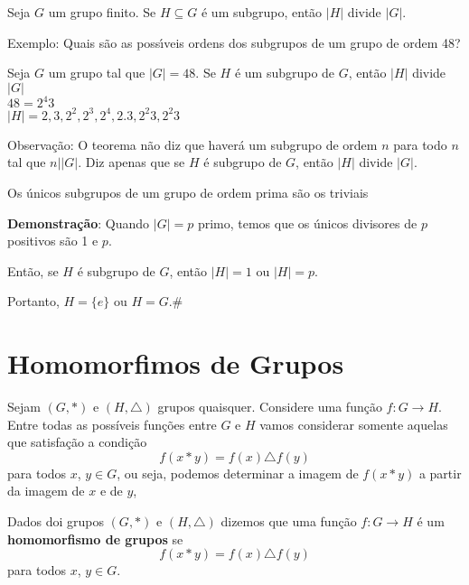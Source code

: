 \begin{teorema}[Lagrange]
Seja $G$ um grupo finito. Se $H\subseteq G$ {\'e} um subgrupo, ent{\~a}o $|H|$ divide $|G|$.
\end{teorema}

Exemplo: Quais s{\~a}o as poss{\'\i}veis ordens dos subgrupos de um grupo de ordem 48?

Seja $G$ um grupo tal que $|G|=48$. Se $H$ {\'e} um subgrupo de $G$, ent{\~a}o $|H|$ divide $|G|$\\
$48=2^{4}3$ \\
$|H|=2,3,2^{2},2^{3},2^{4},2.3,2^{2}3,2^{2}3$

Observa{\c c}{\~a}o: O teorema n{\~a}o diz que haver{\'a} um subgrupo de ordem $n$ para todo $n$ tal que $n||G|$. Diz apenas que se $H$ {\'e} subgrupo de $G$, ent{\~a}o $|H|$ divide $|G|$.

\begin{corolario}
Os {\'u}nicos subgrupos de um grupo de ordem prima s{\~a}o os triviais
\end{corolario}

\textbf{Demonstra{\c c}{\~a}o}: Quando $|G|=p$ primo, temos que os {\'u}nicos divisores de $p$ positivos s{\~a}o 1 e $p$.

Ent{\~a}o, se $H$ {\'e} subgrupo de $G$, ent{\~a}o $|H|=1$ ou $|H|=p$.

Portanto, $H=\{e\}$ ou $H=G$.\#

\section{Homomorfimos de Grupos} %
\label{sec:homomorfimos_de_grupos}

Sejam $(G, *)$ e $(H, \triangle)$ grupos quaisquer. Considere uma função $f : G \to H$. Entre todas as possíveis funções entre $G$ e $H$ vamos considerar somente aquelas que satisfação a condição
\[
	f(x * y) = f(x)\triangle f(y)
\]
para todos $x$, $y \in G$, ou seja, podemos determinar a imagem de $f(x*y)$ a partir da imagem de $x$ e de $y$,

\begin{definicao}
	Dados doi grupos $(G, *)$ e $(H,\triangle)$ dizemos que uma função $f : G \to H$ é um \textbf{homomorfismo de grupos} se
	\[
		f(x * y) = f(x)\triangle f(y)
	\]
	para todos $x$, $y \in G$.
\end{definicao}

